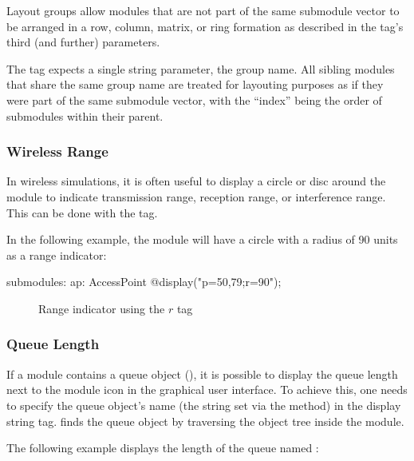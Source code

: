 Layout groups allow modules that are not part of the same submodule vector to be
arranged in a row, column, matrix, or ring formation as described in the 
tag's third (and further) parameters.

The  tag expects a single string parameter, the group name. All sibling
modules that share the same group name are treated for layouting purposes as if
they were part of the same submodule vector, with the ``index'' being the order of
submodules within their parent.


\subsubsection{Wireless Range}
\label{sec:graphics:submodule-wireless-range}

In wireless simulations, it is often useful to display a circle or disc around
the module to indicate transmission range, reception range, or interference
range. This can be done with the  tag.

In the following example, the module will have a circle with a radius of 90
units as a range indicator:

\begin{ned}
submodules:
    ap: AccessPoint {
        @display("p=50,79;r=90");
    }
\end{ned}

\begin{figure}[htbp]
  \begin{center}
    \caption{Range indicator using the $r$ tag}
    \label{fig:graphics-rtag}
  \end{center}
\end{figure}

\subsubsection{Queue Length}
\label{sec:graphics:submodule-queue-length}

If a module contains a queue object (), it is possible to display
the queue length next to the module icon in the graphical user interface. To
achieve this, one needs to specify the queue object's name (the string set via
the  method) in the  display string tag. {\opp} finds
the queue object by traversing the object tree inside the module.

The following example displays the length of the queue named :

